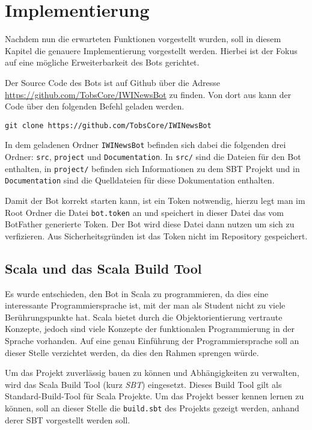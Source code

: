 \chapter{Implementierung}
Nachdem nun die erwarteten Funktionen vorgestellt wurden, soll in diesem Kapitel die genauere Implementierung vorgestellt werden. Hierbei ist der Fokus auf eine mögliche Erweiterbarkeit des Bots gerichtet.

Der Source Code des Bots ist auf Github über die Adresse \url{https://github.com/TobsCore/IWINewsBot} zu finden. Von dort aus kann der Code über den folgenden Befehl geladen werden.

\begin{lstlisting}
git clone https://github.com/TobsCore/IWINewsBot
\end{lstlisting}

In dem geladenen Ordner \texttt{IWINewsBot} befinden sich dabei die folgenden drei Ordner: \texttt{src}, \texttt{project} und \texttt{Documentation}. In \texttt{src/} sind die Dateien für den Bot enthalten, in \texttt{project/} befinden sich Informationen zu dem SBT Projekt und in \texttt{Documentation} sind die Quelldateien für diese Dokumentation enthalten.

Damit der Bot korrekt starten kann, ist ein Token notwendig, hierzu legt man im Root Ordner die Datei \texttt{bot.token} an und speichert in dieser Datei das vom BotFather generierte Token. Der Bot wird diese Datei dann nutzen um sich zu verfizieren. Aus Sicherheitsgründen ist das Token nicht im Repository gespeichert.

\section{Scala und das Scala Build Tool}
Es wurde entschieden, den Bot in Scala zu programmieren, da dies eine interessante Programmiersprache ist, mit der man als Student nicht zu viele Berührungspunkte hat. Scala bietet durch die Objektorientierung vertraute Konzepte, jedoch sind viele Konzepte der funktionalen Programmierung in der Sprache vorhanden. Auf eine genau Einführung der Programmiersprache soll an dieser Stelle verzichtet werden, da dies den Rahmen sprengen würde.

Um das Projekt zuverlässig bauen zu können und Abhängigkeiten zu verwalten, wird das Scala Build Tool (kurz \emph{SBT}) eingesetzt. Dieses Build Tool gilt als Standard-Build-Tool für Scala Projekte. Um das Projekt besser kennen lernen zu können, soll an dieser Stelle die \texttt{build.sbt} des Projekts gezeigt werden, anhand derer SBT vorgestellt werden soll.

